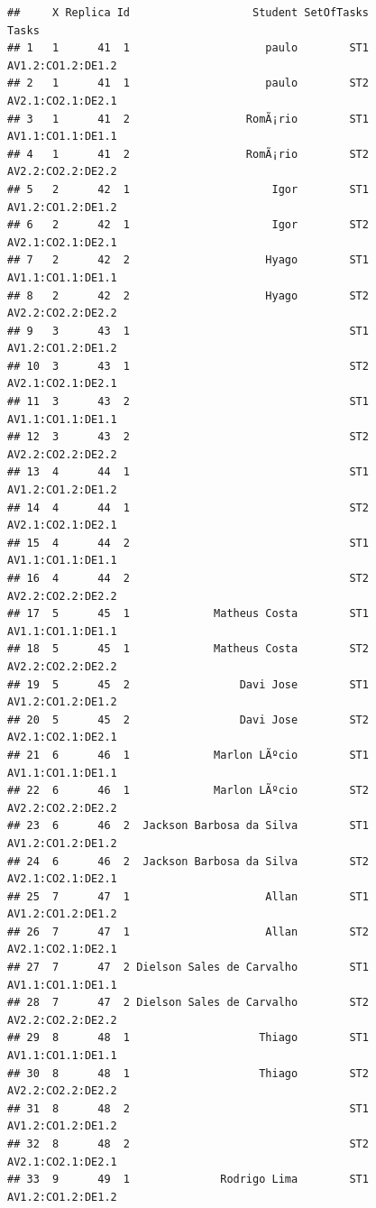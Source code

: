 \documentclass[]{article}
\begin{document}
\begin{verbatim}
##     X Replica Id                   Student SetOfTasks             Tasks
## 1   1      41  1                     paulo        ST1 AV1.2:CO1.2:DE1.2
## 2   1      41  1                     paulo        ST2 AV2.1:CO2.1:DE2.1
## 3   1      41  2                  RomÃ¡rio        ST1 AV1.1:CO1.1:DE1.1
## 4   1      41  2                  RomÃ¡rio        ST2 AV2.2:CO2.2:DE2.2
## 5   2      42  1                      Igor        ST1 AV1.2:CO1.2:DE1.2
## 6   2      42  1                      Igor        ST2 AV2.1:CO2.1:DE2.1
## 7   2      42  2                     Hyago        ST1 AV1.1:CO1.1:DE1.1
## 8   2      42  2                     Hyago        ST2 AV2.2:CO2.2:DE2.2
## 9   3      43  1                                  ST1 AV1.2:CO1.2:DE1.2
## 10  3      43  1                                  ST2 AV2.1:CO2.1:DE2.1
## 11  3      43  2                                  ST1 AV1.1:CO1.1:DE1.1
## 12  3      43  2                                  ST2 AV2.2:CO2.2:DE2.2
## 13  4      44  1                                  ST1 AV1.2:CO1.2:DE1.2
## 14  4      44  1                                  ST2 AV2.1:CO2.1:DE2.1
## 15  4      44  2                                  ST1 AV1.1:CO1.1:DE1.1
## 16  4      44  2                                  ST2 AV2.2:CO2.2:DE2.2
## 17  5      45  1             Matheus Costa        ST1 AV1.1:CO1.1:DE1.1
## 18  5      45  1             Matheus Costa        ST2 AV2.2:CO2.2:DE2.2
## 19  5      45  2                 Davi Jose        ST1 AV1.2:CO1.2:DE1.2
## 20  5      45  2                 Davi Jose        ST2 AV2.1:CO2.1:DE2.1
## 21  6      46  1             Marlon LÃºcio        ST1 AV1.1:CO1.1:DE1.1
## 22  6      46  1             Marlon LÃºcio        ST2 AV2.2:CO2.2:DE2.2
## 23  6      46  2  Jackson Barbosa da Silva        ST1 AV1.2:CO1.2:DE1.2
## 24  6      46  2  Jackson Barbosa da Silva        ST2 AV2.1:CO2.1:DE2.1
## 25  7      47  1                     Allan        ST1 AV1.2:CO1.2:DE1.2
## 26  7      47  1                     Allan        ST2 AV2.1:CO2.1:DE2.1
## 27  7      47  2 Dielson Sales de Carvalho        ST1 AV1.1:CO1.1:DE1.1
## 28  7      47  2 Dielson Sales de Carvalho        ST2 AV2.2:CO2.2:DE2.2
## 29  8      48  1                    Thiago        ST1 AV1.1:CO1.1:DE1.1
## 30  8      48  1                    Thiago        ST2 AV2.2:CO2.2:DE2.2
## 31  8      48  2                                  ST1 AV1.2:CO1.2:DE1.2
## 32  8      48  2                                  ST2 AV2.1:CO2.1:DE2.1
## 33  9      49  1              Rodrigo Lima        ST1 AV1.2:CO1.2:DE1.2

\end{verbatim}
\end{document}
